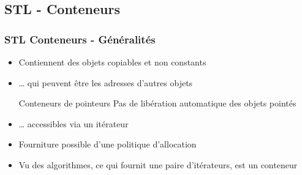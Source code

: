 \documentclass[C++.tex]{subfiles}
\begin{document}
\subsection*{STL - Conteneurs}
\begin{frame}[fragile]
	\frametitle{STL Conteneurs - Généralités}
	\begin{itemize}
		\item Contiennent des objets copiables et non constants


		\item \ldots{} qui peuvent être les adresses d'autres objets

		\begin{alertblock}{Conteneurs de pointeurs}
			Pas de libération automatique des objets \og pointés\fg{}
		\end{alertblock}

		\item \ldots{} accessibles via un itérateur
		\item Fourniture possible d'une politique d'allocation
		\item Vu des algorithmes, ce qui fournit une paire d'itérateurs, est un conteneur
	\end{itemize}
\end{frame}
\end{document}
